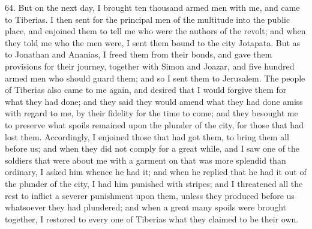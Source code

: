 64. But on the next day, I brought ten thousand armed men with me, and
came to Tiberias. I then sent for the principal men of the multitude into
the public place, and enjoined them to tell me who were the authors of the
revolt; and when they told me who the men were, I sent them bound to the
city Jotapata. But as to Jonathan and Ananias, I freed them from their
bonds, and gave them provisions for their journey, together with Simon and
Joazar, and five hundred armed men who should guard them; and so I sent
them to Jerusalem. The people of Tiberias also came to me again, and
desired that I would forgive them for what they had done; and they said
they would amend what they had done amiss with regard to me, by their
fidelity for the time to come; and they besought me to preserve what
spoils remained upon the plunder of the city, for those that had lost
them. Accordingly, I enjoined those that had got them, to bring them all
before us; and when they did not comply for a great while, and I saw one
of the soldiers that were about me with a garment on that was more
splendid than ordinary, I asked him whence he had it; and when he replied
that he had it out of the plunder of the city, I had him punished with
stripes; and I threatened all the rest to inflict a severer punishment
upon them, unless they produced before us whatsoever they had plundered;
and when a great many spoils were brought together, I restored to every
one of Tiberias what they claimed to be their own.

